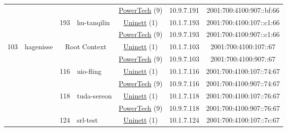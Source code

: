 \begin{small}
\begin{center}
\begin{longtable}{|c|c|c|c|c|c|c|c|}
  &  &  &  & \multicolumn{2}{|c|}{\tiny{\href{http://www.powertech.no}{PowerTech} (9)}} & \tiny{10.9.7.191} & \tiny{2001:700:4100:907::bf:66} \\* \cline{3-3}\cline{4-4}\cline{5-5}\cline{6-6}\cline{7-7}\cline{8-8}
  &  & \multirow{2}{*}{\tiny{193}} & \multicolumn{1}{|l|}{\multirow{2}{*}{\tiny{hu-tanqilin}}} & \multicolumn{2}{|c|}{\tiny{\href{https://www.uninett.no}{Uninett} (1)}} & \tiny{10.1.7.193} & \tiny{2001:700:4100:107::c1:66} \\* \cline{5-5}\cline{6-6}\cline{7-7}\cline{8-8}
  &  &  &  & \multicolumn{2}{|c|}{\tiny{\href{http://www.powertech.no}{PowerTech} (9)}} & \tiny{10.9.7.193} & \tiny{2001:700:4100:907::c1:66} \\ \hline
 \multirow{28}{*}{\tiny{103}} & \multicolumn{1}{|l|}{\multirow{28}{*}{\tiny{hagenisse}}} & \multicolumn{2}{|c|}{\multirow{2}{*}{\tiny{Root Context}}} & \multicolumn{2}{|c|}{\tiny{\href{https://www.uninett.no}{Uninett} (1)}} & \tiny{10.1.7.103} & \tiny{2001:700:4100:107::67} \\* \cline{5-5}\cline{6-6}\cline{7-7}\cline{8-8}
  &  & \multicolumn{2}{|c|}{} & \multicolumn{2}{|c|}{\tiny{\href{http://www.powertech.no}{PowerTech} (9)}} & \tiny{10.9.7.103} & \tiny{2001:700:4100:907::67} \\* \cline{3-3}\cline{4-4}\cline{5-5}\cline{6-6}\cline{7-7}\cline{8-8}
  &  & \multirow{2}{*}{\tiny{116}} & \multicolumn{1}{|l|}{\multirow{2}{*}{\tiny{uio-fling}}} & \multicolumn{2}{|c|}{\tiny{\href{https://www.uninett.no}{Uninett} (1)}} & \tiny{10.1.7.116} & \tiny{2001:700:4100:107::74:67} \\* \cline{5-5}\cline{6-6}\cline{7-7}\cline{8-8}
  &  &  &  & \multicolumn{2}{|c|}{\tiny{\href{http://www.powertech.no}{PowerTech} (9)}} & \tiny{10.9.7.116} & \tiny{2001:700:4100:907::74:67} \\* \cline{3-3}\cline{4-4}\cline{5-5}\cline{6-6}\cline{7-7}\cline{8-8}
  &  & \multirow{2}{*}{\tiny{118}} & \multicolumn{1}{|l|}{\multirow{2}{*}{\tiny{tuda-sereon}}} & \multicolumn{2}{|c|}{\tiny{\href{https://www.uninett.no}{Uninett} (1)}} & \tiny{10.1.7.118} & \tiny{2001:700:4100:107::76:67} \\* \cline{5-5}\cline{6-6}\cline{7-7}\cline{8-8}
  &  &  &  & \multicolumn{2}{|c|}{\tiny{\href{http://www.powertech.no}{PowerTech} (9)}} & \tiny{10.9.7.118} & \tiny{2001:700:4100:907::76:67} \\* \cline{3-3}\cline{4-4}\cline{5-5}\cline{6-6}\cline{7-7}\cline{8-8}
  &  & \multirow{2}{*}{\tiny{124}} & \multicolumn{1}{|l|}{\multirow{2}{*}{\tiny{srl-test}}} & \multicolumn{2}{|c|}{\tiny{\href{https://www.uninett.no}{Uninett} (1)}} & \tiny{10.1.7.124} & \tiny{2001:700:4100:107::7c:67} \\* \cline{5-5}\cline{6-6}\cline{7-7}\cline{8-8}

\end{longtable}
\end{center}
\end{small}
